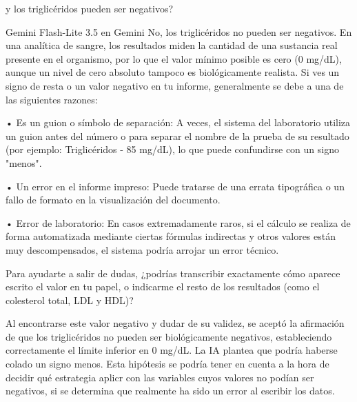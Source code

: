 \documentclass[12pt,a4paper,oneside]{book}
\begin{document}
\begin{iaprompt}
y los triglicéridos pueden ser negativos?
\end{iaprompt}
\begin{iaresp}{Gemini Flash-Lite 3.5 en Gemini}
No, los triglicéridos no pueden ser negativos. En una analítica de sangre, los resultados miden la cantidad de una sustancia real presente en el organismo, por lo que el valor mínimo posible es cero (0 mg/dL), aunque un nivel de cero absoluto tampoco es biológicamente realista.
Si ves un signo de resta o un valor negativo en tu informe, generalmente se debe a una de las siguientes razones:

• Es un guion o símbolo de separación: A veces, el sistema del laboratorio utiliza un guion antes del número o para separar el nombre de la prueba de su resultado (por ejemplo: Triglicéridos - 85 mg/dL), lo que puede confundirse con un signo "menos".

• Un error en el informe impreso: Puede tratarse de una errata tipográfica o un fallo de formato en la visualización del documento.

• Error de laboratorio: En casos extremadamente raros, si el cálculo se realiza de forma automatizada mediante ciertas fórmulas indirectas y otros valores están muy descompensados, el sistema podría arrojar un error técnico.

Para ayudarte a salir de dudas, ¿podrías transcribir exactamente cómo aparece escrito el valor en tu papel, o indicarme el resto de los resultados (como el colesterol total, LDL y HDL)?
\end{iaresp}
\begin{iaanalisis}
Al encontrarse este valor negativo y dudar de su validez, se aceptó la afirmación de que los triglicéridos no pueden ser biológicamente negativos, estableciendo correctamente el límite inferior en 0 mg/dL. La IA plantea que podría haberse colado un signo menos. Esta hipótesis se podría tener en cuenta a la hora de decidir qué estrategia aplicr con las variables cuyos valores no podían ser negativos, si se determina que realmente ha sido un error al escribir los datos.
\end{iaanalisis}
\end{document}
